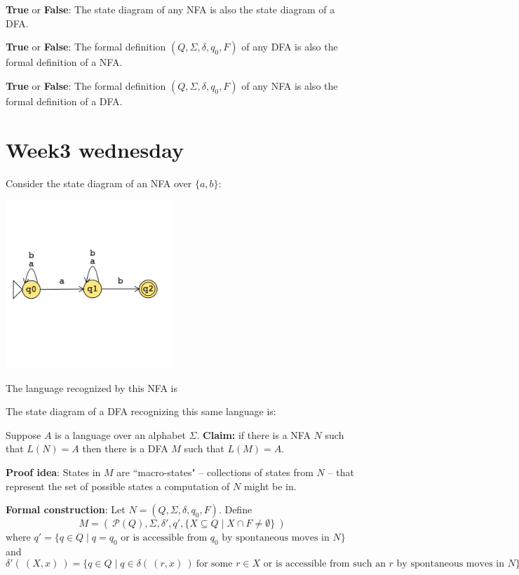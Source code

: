 \documentclass[12pt, oneside]{article}
\begin{document}
{\bf True} or {\bf False}: The state diagram of any NFA is also the state diagram of a DFA.

{\bf True} or {\bf False}: The formal definition $(Q, \Sigma, \delta, q_0, F)$ of any DFA is also the formal definition of a NFA.

{\bf True} or {\bf False}: The formal definition $(Q, \Sigma, \delta, q_0, F)$  of any NFA is also the formal definition of a DFA.

 \vfill
\section*{Week3 wednesday}



Consider the state diagram of an NFA over $\{a,b\}$:

\includegraphics[width=2.5in]{resources/machines/Lect6NFA1.png}


The language recognized by this NFA is



The state diagram of a DFA recognizing this same language is:

\vspace{70pt}
Suppose $A$ is a language over an alphabet $\Sigma$.
{\bf Claim:} if there is a NFA $N$ such that $L(N) = A$ then 
there is a DFA $M$ such that $L(M) = A$.

{\bf Proof idea}: States in $M$ are ``macro-states" -- collections of states from $N$ -- 
that represent the set of possible states a computation of $N$ might be in.


{\bf Formal construction}: Let $N = (Q, \Sigma, \delta, q_0, F)$.  Define 
\[
M = (~ \mathcal{P}(Q), \Sigma, \delta', q',  \{ X \subseteq Q \mid X \cap F \neq \emptyset \}~ )
\]
where $q' = \{ q \in Q \mid \text{$q = q_0$ or is accessible from $q_0$ by spontaneous moves in $N$} \}$
and 
\[
    \delta' (~(X, x)~) = \{ q \in Q \mid q \in \delta( ~(r,x)~) ~\text{for some $r \in X$ or is accessible 
from such an $r$ by spontaneous moves in $N$} \}
\]
\end{document}
